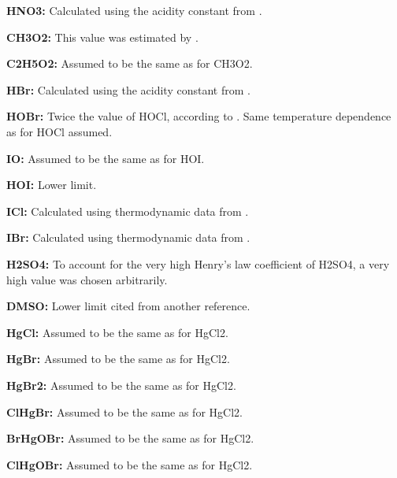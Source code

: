 \item {\bf  HNO3:} Calculated using the acidity constant from \citet  {450}.
\item {\bf  CH3O2:} This value was estimated by \citet  {46}.
\item {\bf  C2H5O2:} Assumed to be the same as for CH3O2.
\item {\bf  HBr:} Calculated using the acidity constant from \citet  {194}.
\item {\bf  HOBr:} Twice the value of HOCl, according to \citet  {288}. Same temperature dependence as for HOCl assumed.
\item {\bf  IO:} Assumed to be the same as for HOI.
\item {\bf  HOI:} Lower limit.
\item {\bf  ICl:} Calculated using thermodynamic data from \citet  {489}.
\item {\bf  IBr:} Calculated using thermodynamic data from \citet  {489}.
\item {\bf  H2SO4:} To account for the very high Henry's law coefficient of H2SO4, a very high value was chosen arbitrarily.
\item {\bf  DMSO:} Lower limit cited from another reference.
\item {\bf  HgCl:} Assumed to be the same as for HgCl2.
\item {\bf  HgBr:} Assumed to be the same as for HgCl2.
\item {\bf  HgBr2:} Assumed to be the same as for HgCl2.
\item {\bf  ClHgBr:} Assumed to be the same as for HgCl2.
\item {\bf  BrHgOBr:} Assumed to be the same as for HgCl2.
\item {\bf  ClHgOBr:} Assumed to be the same as for HgCl2.
